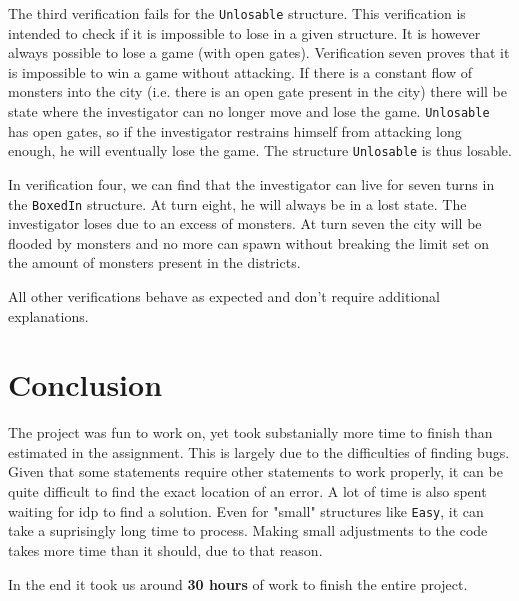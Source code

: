 \documentclass[12pt]{report}
\begin{document}
The third verification fails for the \texttt{Unlosable} structure. This verification is intended to check if it is impossible to lose in a given structure. It is however always possible to lose a game (with open gates). Verification seven proves that it is impossible to win a game without attacking. If there is a constant flow of monsters into the city (i.e. there is an open gate present in the city) there will be state where the investigator can no longer move and lose the game. \texttt{Unlosable} has open gates, so if the investigator restrains himself from attacking long enough, he will eventually lose the game. The structure \texttt{Unlosable} is thus losable.

In verification four, we can find that the investigator can live for seven turns in the \texttt{BoxedIn} structure. At turn eight, he will always be in a lost state. The investigator loses due to an excess of monsters. At turn seven the city will be flooded by monsters and no more can spawn without breaking the limit set on the amount of monsters present in the districts.

All other verifications behave as expected and don't require additional explanations.

\section*{Conclusion}
The project was fun to work on, yet took substanially more time to finish than estimated in the assignment. This is largely due to the difficulties of finding bugs. Given that some statements require other statements to work properly, it can be quite difficult to find the exact location of an error. A lot of time is also spent waiting for idp to find a solution. Even for "small" structures like \texttt{Easy}, it can take a suprisingly long time to process. Making small adjustments to the code takes more time than it should, due to that reason.


In the end it took us around \textbf{30 hours} of work to finish the entire project.
\end{document}
